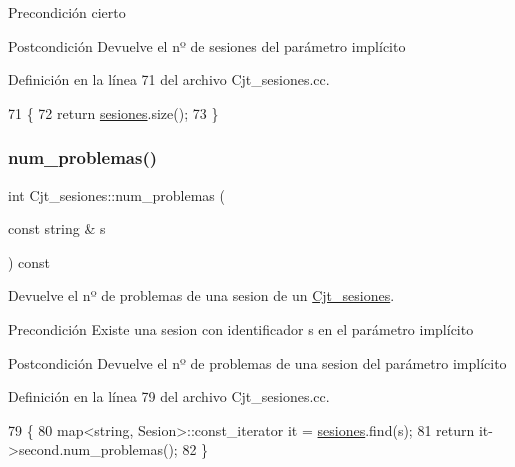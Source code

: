 \begin{DoxyPrecond}{Precondición}
cierto 
\end{DoxyPrecond}
\begin{DoxyPostcond}{Postcondición}
Devuelve el nº de sesiones del parámetro implícito 
\end{DoxyPostcond}


Definición en la línea 71 del archivo Cjt\+\_\+sesiones.\+cc.


\begin{DoxyCode}
71                                          \{
72       \textcolor{keywordflow}{return} \mbox{\hyperlink{class_cjt__sesiones_a87e835a62e561eeb0f93eedbdcbe1802}{sesiones}}.size();
73     \}
\end{DoxyCode}
\mbox{\label{class_cjt__sesiones_a25fab9688073ad869f8e8f53445955d6}} 
\subsubsection{\texorpdfstring{num\+\_\+problemas()}{num\_problemas()}}
{\footnotesize\ttfamily int Cjt\+\_\+sesiones\+::num\+\_\+problemas (\begin{DoxyParamCaption}\item[{const string \&}]{s }\end{DoxyParamCaption}) const}



Devuelve el nº de problemas de una sesion de un \mbox{\hyperlink{class_cjt__sesiones}{Cjt\+\_\+sesiones}}. 

\begin{DoxyPrecond}{Precondición}
Existe una sesion con identificador s en el parámetro implícito 
\end{DoxyPrecond}
\begin{DoxyPostcond}{Postcondición}
Devuelve el nº de problemas de una sesion del parámetro implícito 
\end{DoxyPostcond}


Definición en la línea 79 del archivo Cjt\+\_\+sesiones.\+cc.


\begin{DoxyCode}
79                                                          \{
80       map<string, Sesion>::const\_iterator it = \mbox{\hyperlink{class_cjt__sesiones_a87e835a62e561eeb0f93eedbdcbe1802}{sesiones}}.find(s);
81       \textcolor{keywordflow}{return} it->second.num\_problemas();
82     \}
\end{DoxyCode}
\mbox{\label{class_cjt__sesiones_a61e4dc88659968aa94cb39f99af99a6b}} 
